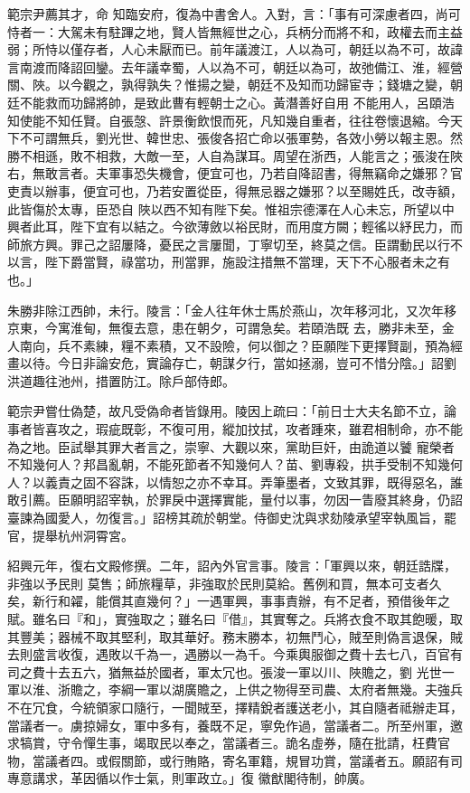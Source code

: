 \begin{pinyinscope}
 範宗尹薦其才，命
 知臨安府，復為中書舍人。入對，言：「事有可深慮者四，尚可恃者一：大駕未有駐蹕之地，賢人皆無經世之心，兵柄分而將不和，政權去而主益弱；所恃以僅存者，人心未厭而已。前年議渡江，人以為可，朝廷以為不可，故諱言南渡而降詔回鑾。去年議幸蜀，人以為不可，朝廷以為可，故弛備江、淮，經營關、陜。以今觀之，孰得孰失？惟揚之變，朝廷不及知而功歸宦寺；錢塘之變，朝廷不能救而功歸將帥，是致此曹有輕朝士之心。黃潛善好自用
 不能用人，呂頤浩知使能不知任賢。自張愨、許景衡飲恨而死，凡知幾自重者，往往卷懷退縮。今天下不可謂無兵，劉光世、韓世忠、張俊各招亡命以張軍勢，各效小勞以報主恩。然勝不相遜，敗不相救，大敵一至，人自為謀耳。周望在浙西，人能言之；張浚在陜右，無敢言者。夫軍事恐失機會，便宜可也，乃若自降詔書，得無竊命之嫌邪？官吏責以辦事，便宜可也，乃若安置從臣，得無忌器之嫌邪？以至賜姓氏，改寺額，此皆傷於太專，臣恐自
 陜以西不知有陛下矣。惟祖宗德澤在人心未忘，所望以中興者此耳，陛下宜有以結之。今欲薄斂以裕民財，而用度方闕；輕徭以紓民力，而師旅方興。罪己之詔屢降，憂民之言屢聞，丁寧切至，終莫之信。臣謂動民以行不以言，陛下爵當賢，祿當功，刑當罪，施設注措無不當理，天下不心服者未之有也。」



 朱勝非除江西帥，未行。陵言：「金人往年休士馬於燕山，次年移河北，又次年移京東，今寓淮甸，無復去意，患在朝夕，可謂急矣。若頤浩既
 去，勝非未至，金人南向，兵不素練，糧不素積，又不設險，何以御之？臣願陛下更擇賢副，預為經畫以待。今日非論安危，實論存亡，朝謀夕行，當如拯溺，豈可不惜分陰。」詔劉洪道趣往池州，措置防江。除戶部侍郎。



 範宗尹嘗仕偽楚，故凡受偽命者皆錄用。陵因上疏曰：「前日士大夫名節不立，論事者皆喜攻之，瑕疵既彰，不復可用，縱加抆拭，攻者踵來，雖君相制命，亦不能為之地。臣試舉其罪大者言之，崇寧、大觀以來，黨助巨奸，由詭道以饕
 寵榮者不知幾何人？邦昌亂朝，不能死節者不知幾何人？苗、劉專殺，拱手受制不知幾何人？以義責之固不容誅，以情恕之亦不幸耳。弄筆墨者，文致其罪，既得惡名，誰敢引薦。臣願明詔宰執，於罪戾中選擇實能，量付以事，勿因一眚廢其終身，仍詔臺諫為國愛人，勿復言。」詔榜其疏於朝堂。侍御史沈與求劾陵承望宰執風旨，罷官，提舉杭州洞霄宮。



 紹興元年，復右文殿修撰。二年，詔內外官言事。陵言：「軍興以來，朝廷誥牒，非強以予民則
 莫售；師旅糧草，非強取於民則莫給。舊例和買，無本可支者久矣，新行和糴，能償其直幾何？」一遇軍興，事事責辦，有不足者，預借後年之賦。雖名曰『和」，實強取之；雖名曰『借』，其實奪之。兵將衣食不取其飽暖，取其豐美；器械不取其堅利，取其華好。務末勝本，初無鬥心，賊至則偽言退保，賊去則盛言收復，遇敗以千為一，遇勝以一為千。今乘輿服御之費十去七八，百官有司之費十去五六，猶無益於國者，軍太冗也。張浚一軍以川、陜贍之，劉
 光世一軍以淮、浙贍之，李綱一軍以湖廣贍之，上供之物得至司農、太府者無幾。夫強兵不在冗食，今統領家口隨行，一聞賊至，擇精銳者護送老小，其自隨者祗辦走耳，當議者一。虜掠婦女，軍中多有，養既不足，寧免作過，當議者二。所至州軍，邀求犒賞，守令憚生事，竭取民以奉之，當議者三。詭名虛券，隨在批請，枉費官物，當議者四。或假關節，或行賄賂，寄名軍籍，規冒功賞，當議者五。願詔有司專意講求，革因循以作士氣，則軍政立。」復
 徽猷閣待制，帥廣。




\end{pinyinscope}
